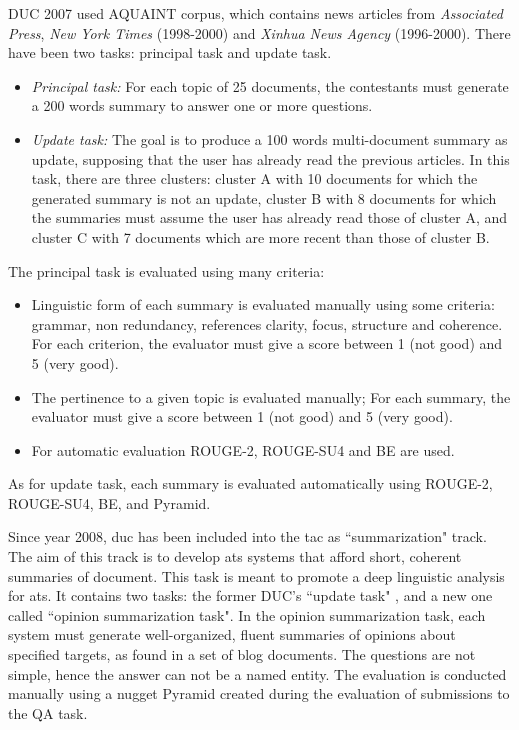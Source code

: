 DUC 2007 used AQUAINT corpus, which contains news articles from \textit{Associated Press}, \textit{New York Times} (1998-2000) and \textit{Xinhua News Agency} (1996-2000).
There have been two tasks: principal task and update task.
%
\begin{itemize}
	\item \textit{Principal task:} For each topic of 25 documents, the contestants must generate a 200 words summary to answer one or more questions.
	
	\item \textit{Update task:} The goal is to produce a 100 words multi-document summary as update, supposing that the user has already read the previous articles.
	In this task, there are three clusters: cluster A with 10 documents for which the generated summary is not an update, cluster B with 8 documents for which the summaries must assume the user has already read those of cluster A, and cluster C with 7 documents which are more recent than those of cluster B.
	
\end{itemize}
The principal task is evaluated using many criteria:
\begin{itemize}
	\item Linguistic form of each summary is evaluated manually using some criteria: grammar, non redundancy, references clarity, focus, structure and coherence.
	For each criterion, the evaluator must give a score between 1 (not good) and 5 (very good).
	
	\item The pertinence to a given topic is evaluated manually; For each summary, the evaluator must give a score between 1 (not good) and 5 (very good).
	
	\item For automatic evaluation ROUGE-2, ROUGE-SU4 and BE are used.
\end{itemize}
As for update task, each summary is evaluated automatically using ROUGE-2, ROUGE-SU4, BE, and Pyramid.

Since year 2008, \ac{duc} has been included into the \ac{tac} as ``summarization" track.
The aim of this track is to develop \ac{ats} systems that afford short, coherent summaries of document.
This task is meant to promote a deep linguistic analysis for \ac{ats}.
It contains two tasks: the former DUC's ``update task" \citep{08-dang-owczarzak}, and a new one called ``opinion summarization task".
In the opinion summarization task, each system must generate well-organized, fluent summaries of opinions about specified targets, as found in a set of blog documents.
The questions are not simple, hence the answer can not be a named entity.
The evaluation is conducted manually using a nugget Pyramid created during the evaluation of submissions to the QA task.

